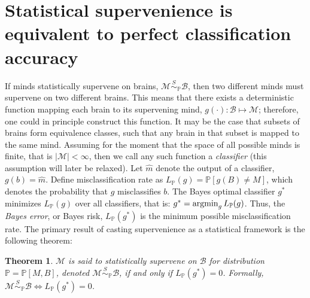 \documentclass{article}
\newcommand{\mB}{\mathcal{B}}
\newcommand{\mM}{\mathcal{M}}
\newcommand{\PP}{\mathbb{P}}           %
\newcommand{\II}{\mathbb{I}}           %
\providecommand{\mc}[1]{\mathcal{#1}}
\providecommand{\mh}[1]{\widehat{#1}}
\newcommand{\argmin}{\operatornamewithlimits{argmin}}
\newcommand{\MsB}{\mM \overset{S}{\sim}_{\PP} \mB}
\newtheorem{thm}{Theorem}
\begin{document}



\section{Statistical supervenience is equivalent to perfect classification accuracy} %
\label{sub:theoretical_results}

If minds statistically supervene on brains, $\MsB$, then two different minds must supervene on two different brains.  This means that there exists a deterministic function mapping each brain to its supervening mind, $g(\cdot): \mB \mapsto \mM$; therefore, one could in principle construct this function.  It may be the case that subsets of brains form equivalence classes, such that any brain in that subset is mapped to the same mind.  Assuming for the moment that the space of all possible minds is finite, that is $| \mM| < \infty$, then we call any such function a \emph{classifier} (this assumption will later be relaxed).  Let $\mh{m}$ denote the output of a classifier, $g(b)=\mh{m}$.  Define misclassification rate as
	$L_{\PP}(g) = \PP[g(B) \neq M]$, %
which denotes the probability that $g$ misclassifies $b$. The Bayes optimal classifier $g^*$ minimizes $L_{\PP}(g)$ over all classifiers, that is:
	$g^* = \argmin_{g} L_{\PP}(g)$.
Thus, the \emph{Bayes error}, or Bayes risk, $L_{\PP}(g^*)$ is the minimum possible misclassification rate. The primary result of casting supervenience as a statistical framework is the following theorem: 
\begin{thm}
\label{thm1} 
$\mM$ is said to \textit{statistically supervene} on $\mB$ for distribution $\PP=\PP[M,B]$, denoted $\mM \overset{S}{\sim}_{\PP} \mB$, if and only if $L_{\PP}(g^*) = 0$. Formally, \mbox{$\MsB \Leftrightarrow L_{\PP}(g^*)=0$}.  
\end{thm}
\end{document}
